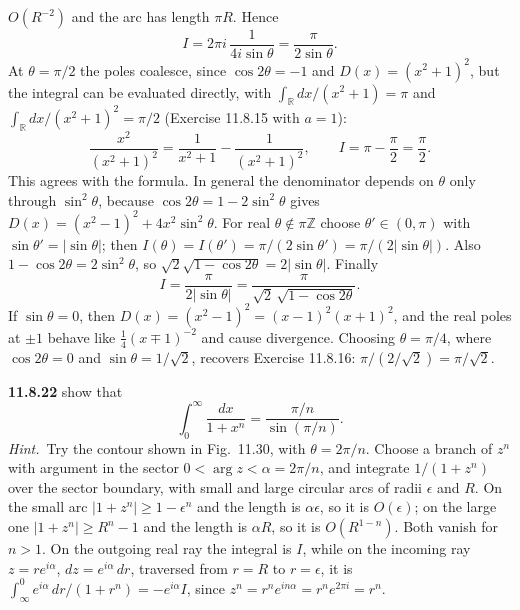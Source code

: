 $O(R^{-2})$ and the arc has length $\pi R$. Hence
\[
I=2\pi i\,\frac1{4i\sin\theta}
=\frac{\pi}{2\sin\theta}.
\]
At $\theta=\pi/2$ the poles coalesce, since $\cos2\theta=-1$ and
$D(x)=(x^2+1)^2$, but the integral can be evaluated directly, with
$\int_{\mathbb R}dx/(x^2+1)=\pi$ and
$\int_{\mathbb R}dx/(x^2+1)^2=\pi/2$ (Exercise 11.8.15 with $a=1$):
\[
\frac{x^2}{(x^2+1)^2}
=\frac1{x^2+1}-\frac1{(x^2+1)^2},\qquad
I=\pi-\frac{\pi}{2}=\frac{\pi}{2}.
\]
This agrees with the formula. In general the denominator depends on
$\theta$ only through $\sin^2\theta$, because
$\cos2\theta=1-2\sin^2\theta$ gives
$D(x)=(x^2-1)^2+4x^2\sin^2\theta$. For real $\theta\notin\pi\mathbb Z$
choose $\theta'\in(0,\pi)$ with $\sin\theta'=|\sin\theta|$; then
$I(\theta)=I(\theta')=\pi/(2\sin\theta')=\pi/(2|\sin\theta|)$. Also
$1-\cos2\theta=2\sin^2\theta$, so
$\sqrt2\sqrt{1-\cos2\theta}=2|\sin\theta|$. Finally
\[
\boxed{I=\frac{\pi}{2|\sin\theta|}
=\frac{\pi}{\sqrt2\,\sqrt{1-\cos2\theta}}}.
\]
If $\sin\theta=0$, then $D(x)=(x^2-1)^2=(x-1)^2(x+1)^2$, and the real
poles at $\pm1$ behave like $\frac14(x\mp1)^{-2}$ and cause divergence.
Choosing $\theta=\pi/4$, where $\cos2\theta=0$ and
$\sin\theta=1/\sqrt2$, recovers Exercise 11.8.16:
$\pi/(2/\sqrt2)=\pi/\sqrt2$.

\par\bigskip
\noindent\textbf{11.8.22}\quad {} show that
\[
\int_{0}^{\infty}\frac{dx}{1+x^{n}}=\frac{\pi/n}{\sin(\pi/n)}.
\]
\emph{Hint.}~Try the contour shown in Fig.~11.30, with $\theta=2\pi/n$.
\solution
{}
Choose a branch of $z^n$ with argument in the sector
$0<\arg z<\alpha=2\pi/n$, and integrate $1/(1+z^n)$ over the
sector boundary, with small and large circular arcs of radii
$\epsilon$ and $R$. On the small arc $|1+z^n|\ge1-\epsilon^n$ and the
length is $\alpha\epsilon$, so it is $O(\epsilon)$; on the large one
$|1+z^n|\ge R^n-1$ and the length is $\alpha R$, so it is
$O(R^{1-n})$. Both vanish for $n>1$.
On the outgoing real ray the integral is $I$, while on the incoming
ray $z=re^{i\alpha}$, $dz=e^{i\alpha}\,dr$, traversed from $r=R$ to
$r=\epsilon$, it is
$\int_\infty^0e^{i\alpha}\,dr/(1+r^n)=-e^{i\alpha}I$, since
$z^n=r^ne^{in\alpha}=r^ne^{2\pi i}=r^n$.

